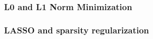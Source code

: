 \subsubsection{L0 and L1 Norm Minimization}

\subsubsection{LASSO and sparsity regularization}

%  
%



